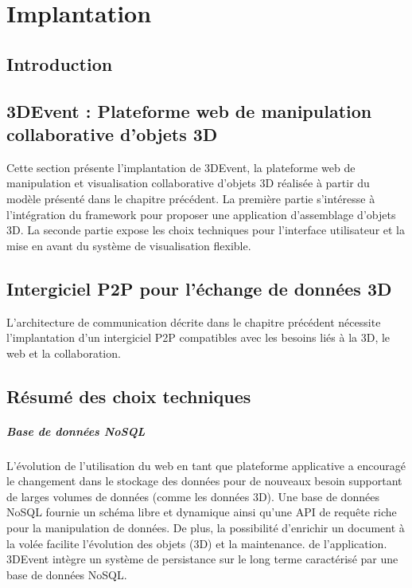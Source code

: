 
\chapter{Implantation}
\chaptertable

\section{Introduction}
\section{3DEvent : Plateforme web de manipulation collaborative d'objets 3D}

Cette section présente l'implantation de 3DEvent, la plateforme web de 
manipulation et visualisation collaborative d'objets 3D réalisée à partir du modèle 
présenté dans le chapitre précédent. La première partie s'intéresse à l'intégration 
du framework pour proposer une application d'assemblage d'objets 3D. La seconde 
partie expose les choix techniques pour l'interface utilisateur et la mise en avant 
du système de visualisation flexible.



\section{Intergiciel P2P pour l'échange de données 3D}

L'architecture de communication décrite dans le chapitre précédent nécessite 
l'implantation d'un intergiciel P2P compatibles avec les besoins liés à la 3D, le 
web et la collaboration. 




\section{Résumé des choix techniques}

\paragraph{Base de données NoSQL}\label{p:nosql} L'évolution de 
l'utilisation du web en tant que plateforme applicative a encouragé le changement 
dans le stockage des données pour de nouveaux besoin supportant de larges 
volumes de données (comme les données 3D). Une base de données \gls{NoSQL} 
fournie un schéma libre et dynamique ainsi qu'une API de requête riche pour la 
manipulation de données. De plus, la possibilité d'enrichir un document à la volée 
facilite l'évolution des objets (3D) et la maintenance. de l'application.
3DEvent intègre un système de persistance sur le long terme caractérisé par une 
base de données \gls{NoSQL}.

